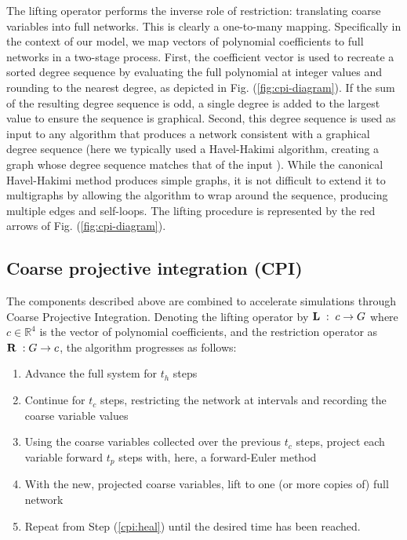   The lifting operator performs the inverse role of restriction:
  translating coarse variables into full networks.
  This is clearly a one-to-many mapping.
  Specifically in the context of our model, we map vectors of
  polynomial coefficients to full networks in a two-stage process.
  First, the coefficient vector is used to recreate a sorted degree
  sequence by evaluating the full polynomial at integer values and
  rounding to the nearest degree, as depicted in
  Fig. (\ref{fig:cpi-diagram}).
  If the sum of the resulting degree sequence is odd, a single degree
  is added to the largest value to ensure the sequence is graphical.
  Second, this degree sequence is used as input to any algorithm that
  produces a network consistent with a graphical degree sequence (here
  we typically used a Havel-Hakimi algorithm, creating a graph whose
  degree sequence matches that of the input
  \cite{havel_remark_1955,hakimi_realizability_1962}).
  While the canonical Havel-Hakimi method produces simple graphs, it
  is not difficult to extend it to multigraphs by allowing the
  algorithm to wrap around the sequence, producing multiple edges and
  self-loops.  The lifting procedure is represented by the red arrows
  of Fig. (\ref{fig:cpi-diagram}).

  \subsection{Coarse projective integration (CPI)}
  \label{sec:cpi}

  The components described above are combined to accelerate
  simulations through Coarse Projective Integration.
  Denoting the lifting operator by
  $\mathbf{L} \; : \; c \rightarrow G$ where $c \in \mathbb{R}^4$ is
  the vector of polynomial coefficients, and the restriction operator
  as $\mathbf{R} \; : G \rightarrow c$, the algorithm progresses as
  follows:

  \begin{enumerate}
  \item Advance the full system for $t_h$ steps
    \label{cpi:heal}
  \item Continue for $t_c$ steps, restricting the network at intervals
    and recording the coarse variable values
  \item Using the coarse variables collected over the previous $t_c$
    steps, project each variable forward $t_p$ steps with, here, a
    forward-Euler method
    \label{cpi:proj}
  \item With the new, projected coarse variables, lift to one (or more
    copies of) full network
    \label{cpi:init}
  \item Repeat from Step (\ref{cpi:heal}) until the desired time has
    been reached.
  \end{enumerate}

